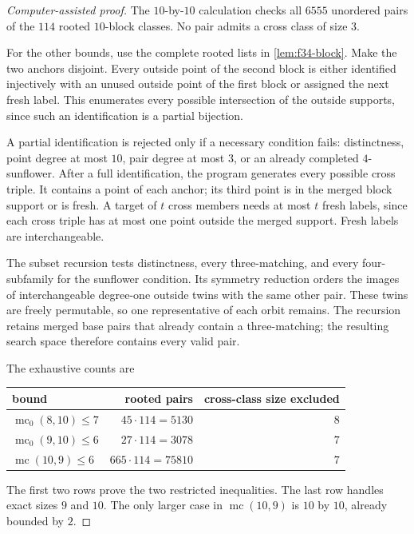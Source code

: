 \documentclass[11pt]{article}
\numberwithin{equation}{section}
\theoremstyle{definition}
\theoremstyle{remark}
\newcommand{\mc}{\operatorname{mc}}
\newcommand{\mcz}{\operatorname{mc}_0}
\begin{document}
\begin{proof}[Computer-assisted proof]
The $10$-by-$10$ calculation checks all $6555$ unordered pairs of the $114$
rooted $10$-block classes. No pair admits a cross class of size $3$.

For the other bounds, use the complete rooted lists in
\cref{lem:f34-block}. Make the two anchors disjoint. Every outside point of
the second block is either identified injectively with an unused outside
point of the first block or assigned the next fresh label. This enumerates
every possible intersection of the outside supports, since such an
identification is a partial bijection.

A partial identification is rejected only if a necessary condition fails:
distinctness, point degree at most $10$, pair degree at most $3$, or an
already completed $4$-sunflower. After a full identification, the program
generates every possible cross triple. It contains a point of each anchor;
its third point is in the merged block support or is fresh. A target of $t$
cross members needs at most $t$ fresh labels, since each cross triple has at
most one point outside the merged support. Fresh labels are interchangeable.

The subset recursion tests distinctness, every three-matching, and every
four-subfamily for the sunflower condition. Its symmetry reduction orders
the images of interchangeable degree-one outside twins with the same other
pair. These twins are freely permutable, so one representative of each orbit
remains. The recursion retains merged base pairs that already contain a
three-matching; the resulting search space therefore contains every valid
pair.

The exhaustive counts are
\begin{center}
\begin{tabular}{@{}lrr@{}}
\toprule
bound & rooted pairs & cross-class size excluded\\
\midrule
$\mcz(8,10)\le7$ & $45\cdot114=5130$ & $8$\\
$\mcz(9,10)\le6$ & $27\cdot114=3078$ & $7$\\
$\mc(10,9)\le6$  & $665\cdot114=75810$ & $7$\\
\bottomrule
\end{tabular}
\end{center}
The first two rows prove the two restricted inequalities. The last row
handles exact sizes $9$ and $10$. The only larger case in $\mc(10,9)$ is
$10$ by $10$, already bounded by $2$.
\end{proof}
\end{document}
